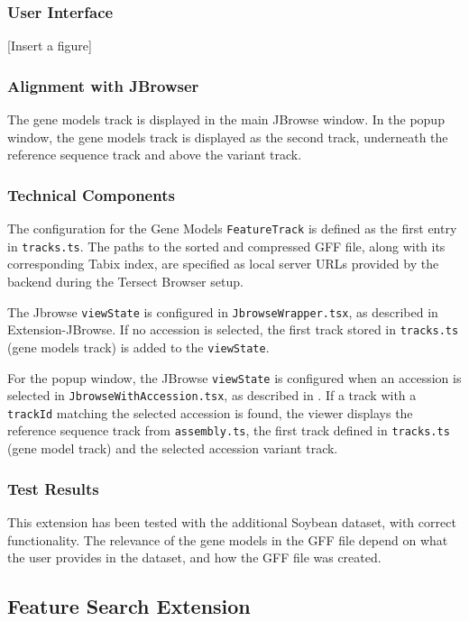 \documentclass[12pt]{article}
\begin{document}
\subsubsection{User Interface}

[Insert a figure] 

\subsubsection{Alignment with JBrowser}
The gene models track is displayed in the main JBrowse window. In the popup window, the gene models track is displayed as the second track, underneath the reference sequence track and above the variant track.

\subsubsection{Technical Components}
The configuration for the Gene Models \verb+FeatureTrack+ is defined as the first entry in \verb+tracks.ts+. The paths to the sorted and compressed GFF file, along with its corresponding Tabix index, are specified as local server URLs provided by the backend during the Tersect Browser setup. 

The Jbrowse \verb+viewState+ is configured in \verb+JbrowseWrapper.tsx+, as described in Extension-JBrowse. If no accession is selected, the first track stored in \verb+tracks.ts+ (gene models track) is added to the \verb+viewState+.

For the popup window, the JBrowse \verb+viewState+ is configured when an accession is selected in \verb+JbrowseWithAccession.tsx+, as described in . If a track with a \verb+trackId+ matching the selected accession is found, the viewer displays the reference sequence track from \verb+assembly.ts+, the first track defined in \verb+tracks.ts+ (gene model track) and the selected accession variant track. 

\subsubsection{Test Results}
This extension has been tested with the additional Soybean dataset, with correct functionality. The relevance of the gene models in the GFF file depend on what the user provides in the dataset, and how the GFF file was created. 
\clearpage
\subsection{Feature Search Extension}
\end{document}
